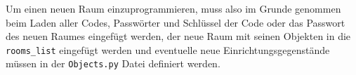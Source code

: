 Um einen neuen Raum einzuprogrammieren, muss also im Grunde genommen beim Laden aller Codes, Passwörter und Schlüssel der Code oder das Passwort des neuen Raumes eingefügt werden, der neue Raum mit seinen Objekten in die \verb+rooms_list+ eingefügt werden und eventuelle neue Einrichtungsgegenstände müssen in der \verb+Objects.py+ Datei definiert werden.